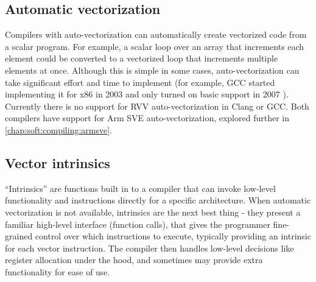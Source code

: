 \subsection{Automatic vectorization}
Compilers with auto-vectorization can automatically create vectorized code from a scalar program.
For example, a scalar loop over an array that increments each element could be converted to a vectorized loop that increments multiple elements at once.
Although this is simple in some cases, auto-vectorization can take significant effort and time to implement (for example, GCC started implementing it for x86 in 2003 and only turned on basic support in 2007 ).
Currently there is no support for RVV auto-vectorization in Clang or GCC.
Both compilers have support for Arm SVE auto-vectorization, explored further in \cref{chap:soft:compiling:armsve}.

\subsection{Vector intrinsics}
\enquote{Intrinsics} are functions built in to a compiler that can invoke low-level functionality and instructions directly for a specific architecture.
When automatic vectorization is not available, intrinsics are the next best thing - they present a familiar high-level interface (function calls), that gives the programmer fine-grained control over which instructions to execute, typically providing an intrinsic for each vector instruction.
The compiler then handles low-level decisions like register allocation under the hood, and sometimes may provide extra functionality for ease of use.


